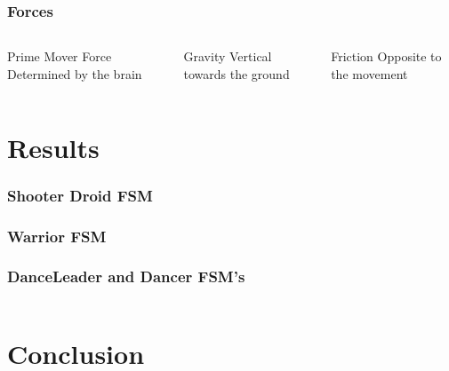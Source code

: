 \documentclass{beamer}
\begin{document}
\begin{frame}
\frametitle{Forces}
\begin{center}
\begin{columns}
	\column{4cm}
	\column{4cm}
	\begin{exampleblock}{Prime Mover Force}
		Determined by the brain
	\end{exampleblock}
	\begin{block}{Gravity}
		Vertical towards the ground
	\end{block}
	\begin{alertblock}{Friction}
		Opposite to the movement
	\end{alertblock}
\end{columns}
\end{center}
\end{frame}

\section{Results}

\begin{frame}
\frametitle{Shooter Droid FSM}
\begin{center}
\end{center}
\end{frame}

\begin{frame}
\frametitle{Warrior FSM}
\begin{center}
\end{center}
\end{frame}

\begin{frame}
\frametitle{DanceLeader and Dancer FSM's}
\begin{center}
\begin{columns}
\column{4cm}
\column{4cm}
\end{columns}
\end{center}
\end{frame}

\section{Conclusion}
\end{document}
